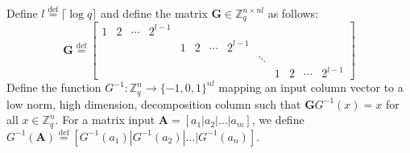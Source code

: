 Define $l \stackrel{\mathrm{def}}{=} \lceil \log q \rceil$ and define the matrix $\textbf{G} \in \mathbb{Z}_q^{n \times nl}$ as follows:
\begin{equation*}
    \textbf{G} \stackrel{\mathrm{def}}{=}
    \left[
        \begin{array}{ccccccccccccc}
        1 & 2 & \cdots & 2^{l-1} \\
         & & & & 1 & 2 & \cdots  & 2^{l-1} \\
         & & & & & & & & \ddots \\
         & & & & & & & & & 1 & 2 & \cdots & 2^{l-1}
        \end{array}
    \right]
\end{equation*}
Define the function $G^{-1} \colon \mathbb{Z}_q^n \rightarrow \{-1, 0, 1\}^{nl}$ mapping an input column vector to a low norm, high dimension, decomposition column such that $\textbf{G}G^{-1}(x) = x$ for all $x \in \mathbb{Z}_q^n$. For a matrix input $\textbf{A} = [ a_1 | a_2 | \dots | a_m]$, we define $G^{-1}(\textbf{A}) \stackrel{\mathrm{def}}{=} [G^{-1}(a_1)|G^{-1}(a_2)| \dots |G^{-1}(a_n)]$.

